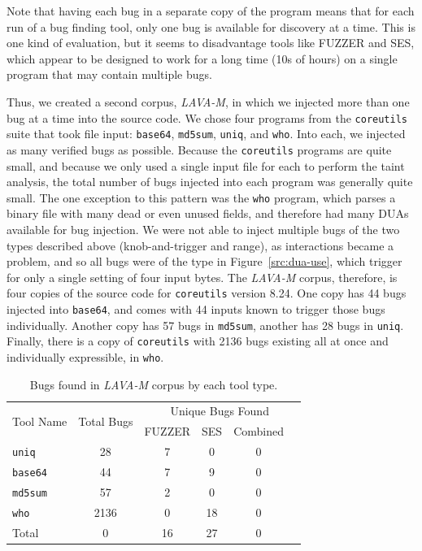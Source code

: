 Note that having each bug in a separate copy of the program means that for each run of a bug finding tool, only one bug is available for discovery at a time.  
This is one kind of evaluation, but it seems to disadvantage tools like FUZZER and SES, which appear to be designed to work for a long time (10s of hours) on a single program that may contain multiple bugs. 

Thus, we created a second corpus, \emph{LAVA-M}, in which we injected more than one bug at a time into the source code.
We chose four programs from the \verb+coreutils+ suite that took file input: \verb+base64+, \verb+md5sum+, \verb+uniq+, and \verb+who+.
Into each, we injected as many verified bugs as possible.
Because the \verb+coreutils+ programs are quite small, and because we only used a single input file for each to perform the taint analysis, the total number of bugs injected into each program was generally quite small.
The one exception to this pattern was the \verb+who+ program, which parses a binary file with many dead or even unused fields, and therefore had many DUAs available for bug injection.
We were not able to inject multiple bugs of the two types described above (knob-and-trigger and range), as interactions became a problem, and so all bugs were of the type in Figure~\ref{src:dua-use}, which trigger for only a single setting of four input bytes.  
The \emph{LAVA-M} corpus, therefore, is four copies of the source code for \verb+coreutils+ version 8.24.
One copy has 44 bugs injected into \verb+base64+, and comes with 44 inputs known to trigger those bugs individually.
Another copy has 57 bugs in \verb+md5sum+, another has 28 bugs in \verb+uniq+.
Finally, there is a copy of \verb+coreutils+ with 2136 bugs existing all at once and individually expressible, in \verb+who+.


\begin{table}[h]
\centering
\begin{tabular}{l|c|c|c|c|c} 
\multirow{2}{*}{Tool Name} & \multirow{2}{*}{Total Bugs} & \multicolumn{4}{c}{Unique Bugs Found} \\
              &            & FUZZER       & SES     & Combined \\ \hline 
\verb+uniq+   &    28      & 7                 & 0          & 0               \\
\verb+base64+ &    44      & 7              & 9          & 0               \\
\verb+md5sum+ &    57      & 2             & 0          & 0               \\
\verb+who+    &    2136    & 0              & 18          & 0               \\
Total         &    0       & 16                 & 27          & 0               \\
\end{tabular}
\caption{Bugs found in \emph{LAVA-M} corpus by each tool type.}
\label{table:tool-eval-results-coreutils}
\end{table}

